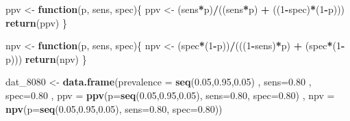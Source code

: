 \documentclass[12pt, twoside]{amherstthesis}
\newenvironment{Shaded}{\begin{snugshade}}{\end{snugshade}}
\newcommand{\AttributeTok}[1]{\textcolor[rgb]{0.13,0.29,0.53}{#1}}
\newcommand{\ControlFlowTok}[1]{\textcolor[rgb]{0.13,0.29,0.53}{\textbf{#1}}}
\newcommand{\DecValTok}[1]{\textcolor[rgb]{0.00,0.00,0.81}{#1}}
\newcommand{\FloatTok}[1]{\textcolor[rgb]{0.00,0.00,0.81}{#1}}
\newcommand{\FunctionTok}[1]{\textcolor[rgb]{0.13,0.29,0.53}{\textbf{#1}}}
\newcommand{\NormalTok}[1]{#1}
\newcommand{\OtherTok}[1]{\textcolor[rgb]{0.56,0.35,0.01}{#1}}
\newcommand{\SpecialCharTok}[1]{\textcolor[rgb]{0.81,0.36,0.00}{\textbf{#1}}}
\begin{document}
\begin{Shaded}
\begin{Highlighting}[]
\NormalTok{ppv }\OtherTok{\textless{}{-}} \ControlFlowTok{function}\NormalTok{(p, sens, spec)\{}
\NormalTok{  ppv }\OtherTok{\textless{}{-}}\NormalTok{ (sens}\SpecialCharTok{*}\NormalTok{p)}\SpecialCharTok{/}\NormalTok{((sens}\SpecialCharTok{*}\NormalTok{p) }\SpecialCharTok{+}\NormalTok{ ((}\DecValTok{1}\SpecialCharTok{{-}}\NormalTok{spec)}\SpecialCharTok{*}\NormalTok{(}\DecValTok{1}\SpecialCharTok{{-}}\NormalTok{p)))}
  \FunctionTok{return}\NormalTok{(ppv)}
\NormalTok{\}}

\NormalTok{npv }\OtherTok{\textless{}{-}} \ControlFlowTok{function}\NormalTok{(p, sens, spec)\{}
\NormalTok{  npv }\OtherTok{\textless{}{-}}\NormalTok{ (spec}\SpecialCharTok{*}\NormalTok{(}\DecValTok{1}\SpecialCharTok{{-}}\NormalTok{p))}\SpecialCharTok{/}\NormalTok{(((}\DecValTok{1}\SpecialCharTok{{-}}\NormalTok{sens)}\SpecialCharTok{*}\NormalTok{p) }\SpecialCharTok{+}\NormalTok{ (spec}\SpecialCharTok{*}\NormalTok{(}\DecValTok{1}\SpecialCharTok{{-}}\NormalTok{p)))}
  \FunctionTok{return}\NormalTok{(npv)}
\NormalTok{\}}

\NormalTok{dat\_8080 }\OtherTok{\textless{}{-}} \FunctionTok{data.frame}\NormalTok{(}\AttributeTok{prevalence =} \FunctionTok{seq}\NormalTok{(}\FloatTok{0.05}\NormalTok{,}\FloatTok{0.95}\NormalTok{,}\FloatTok{0.05}\NormalTok{)}
\NormalTok{                       , }\AttributeTok{sens=}\FloatTok{0.80}
\NormalTok{                       , }\AttributeTok{spec=}\FloatTok{0.80}
\NormalTok{                       , }\AttributeTok{ppv =} \FunctionTok{ppv}\NormalTok{(}\AttributeTok{p=}\FunctionTok{seq}\NormalTok{(}\FloatTok{0.05}\NormalTok{,}\FloatTok{0.95}\NormalTok{,}\FloatTok{0.05}\NormalTok{), }
                                   \AttributeTok{sens=}\FloatTok{0.80}\NormalTok{, }
                                   \AttributeTok{spec=}\FloatTok{0.80}\NormalTok{)}
\NormalTok{                       , }\AttributeTok{npv =} \FunctionTok{npv}\NormalTok{(}\AttributeTok{p=}\FunctionTok{seq}\NormalTok{(}\FloatTok{0.05}\NormalTok{,}\FloatTok{0.95}\NormalTok{,}\FloatTok{0.05}\NormalTok{), }
                                   \AttributeTok{sens=}\FloatTok{0.80}\NormalTok{, }
                                   \AttributeTok{spec=}\FloatTok{0.80}\NormalTok{))}


\end{Highlighting}
\end{Shaded}
\end{document}
